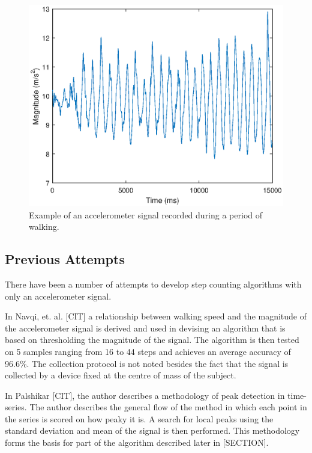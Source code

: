                 \begin{figure}[h]
                    \includegraphics[width=\textwidth]{Images/accel_signal.eps}
                    \centering
                    \caption{Example of an accelerometer signal recorded during a period of walking.}
                    \label{img_accel_ex}
                \end{figure}

            \subsection{Previous Attempts}

                There have been a number of attempts to develop step counting algorithms with only an accelerometer signal.

                In Navqi, et. al. [CIT] a relationship between walking speed and the magnitude of the accelerometer signal is derived and used in devising an algorithm that is based on thresholding the magnitude of the signal. The algorithm is then tested on 5 samples ranging from 16 to 44 steps and achieves an average accuracy of 96.6\%. The collection protocol is not noted besides the fact that the signal is collected by a device fixed at the centre of mass of the subject.

                In Palshikar [CIT], the author describes a methodology of peak detection in time-series. The author describes the general flow of the method in which each point in the series is scored on how peaky it is. A search for local peaks using the standard deviation and mean of the signal is then performed. This methodology forms the basis for part of the algorithm described later in [SECTION].

